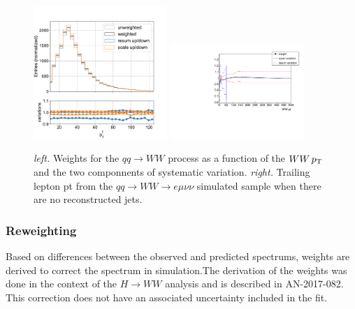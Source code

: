 \begin{figure}[ht]
    \centering
    \includegraphics[width=0.45\textwidth]{chapters/Analysis/sectionDataset/figures/ww_pt_lepton_pt}
    \includegraphics[width=0.45\textwidth]{chapters/Analysis/sectionDataset/figures/ww_pt_weight_variations}
    \caption{\emph{left.} Weights for the $qq\rightarrow WW$ process as a function of the $WW\,p_{\mathrm{T}}$ and the two componnents of systematic variation.  \emph{right.} Trailing lepton pt from the $qq\rightarrow WW\rightarrow e\mu\nu\nu$ simulated sample when there are no reconstructed jets.} 
    \label{fig:analysis:dataset:ww_weight}
\end{figure}

\FloatBarrier


\subsubsection{\cPZ \pt Reweighting}
Based on differences between the observed and predicted \PZ \pt spectrums, weights are derived to correct the \pt spectrum in simulation.The derivation of the weights was done in the context of the $H\rightarrow WW$ analysis and is described in AN-2017-082. This correction does not have an associated uncertainty included in the fit.


